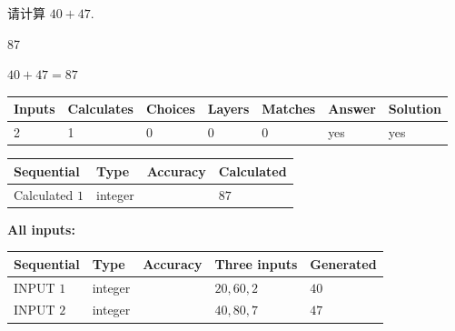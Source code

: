 \documentclass{ctexart}
\begin{document}
  
 
请计算 $ %
40 +  %
47 $.
 
 
 
\noindent{}
 
 

87
 
 
\noindent{}
 
 

 
 
 
\noindent{}
 
 

$ %
40 +  %
47=   %
87$
 
 
\noindent{}
 
 

 
   
   
   
   
\noindent\begin{tabular}{|l|l|l|l|l|l|l|}
 \hline
Inputs & Calculates & Choices & Layers & Matches & Answer & Solution \\ \hline
 2  & 
 1  & 
 0
  & 
 0  & 
 0  & 
  yes & 
  yes 
  \\ \hline
 \end{tabular}
   
   
   
   
\noindent{}
   
   
  
  
\noindent\begin{tabular}{|l|l|l|l|}
\hline
 Sequential & Type & Accuracy & Calculated \\ 
\hline
 
 
  Calculated $  1 $ & integer &  & 
  $ 87 $ 
 \\  \hline  
 \end{tabular}
   
   
   
   
\noindent\vspace{0.1in}\hspace{-0.08in} {\textbf{\Large{All inputs: }}}
   
   
  
  
\noindent\begin{tabular}{|l|l|l|l|l|}
\hline
 Sequential & Type & Accuracy & Three inputs & Generated \\ 
\hline
 
 
  INPUT $  1 $ & integer &  & $
 20
 , 
 60
 , 
 2
 $ & $ 40 $ 
 \\  \hline  
 
 
  INPUT $  2 $ & integer &  & $
 40
 , 
 80
 , 
 7
 $ & $ 47 $ 
 \\  \hline  
 \end{tabular}
   
\end{document}
